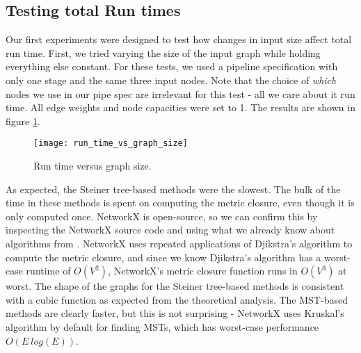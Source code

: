 \documentclass{acmart}
\begin{document}
	\subsection{Testing total Run times}
	Our first experiments were designed to test how changes in input size affect total run time. First, we tried varying the size of the input graph while holding everything else constant. For these tests, we used a pipeline specification with only one stage and the same three input nodes. Note that the choice of \textit{which} nodes we use in our pipe spec are irrelevant for this test - all we care about it run time. All edge weights and node capacities were set to 1. The results are shown in figure \ref{fig:rt_gs}.
	
	\begin{figure}[H]
	    \centering
	    \texttt{[image: run\_time\_vs\_graph\_size]}
	    \caption{Run time versus graph size.}
	    \label{fig:rt_gs}
	\end{figure}
	As expected, the Steiner tree-based methods were the slowest. The bulk of the time in these methods is spent on computing the metric closure, even though it is only computed once. NetworkX is open-source, so we can confirm this by inspecting the NetworkX source code and using what we already know about algorithms from \cite{Cormen09introductionto}. NetworkX uses repeated applications of Djikstra's algorithm to compute the metric closure, and since we know Djikstra's algorithm has a worst-case runtime of $O(V^{2})$, NetworkX's metric closure function runs in $O(V^{3})$ at worst. The shape of the graphs for the Steiner tree-based methods is consistent with a cubic function as expected from the theoretical analysis. The MST-based methods are clearly faster, but this is not surprising - NetworkX uses Kruskal's algorithm by default for finding MSTs, which has worst-case performance $O(E\ log(E))$.
	
\end{document}
